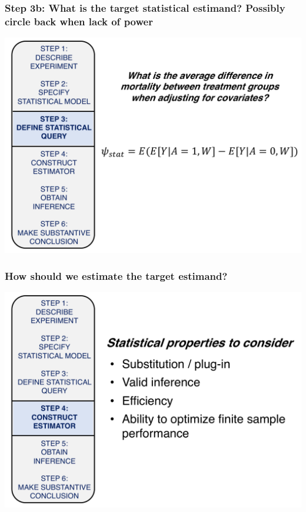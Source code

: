 \documentclass[t]{beamer}
\begin{document}
\begin{frame}
  \frametitle{Step 3b: What is the target statistical estimand? Possibly circle back when lack of power}
 \vspace{-20pt}
  \begin{center}
  \includegraphics[width = 1.05\textwidth]{figures/roadmap3_2.pdf}
  \end{center}
\end{frame}

\begin{frame}
  \frametitle{How should we estimate the target estimand?}
  \vspace{-20pt}
  \begin{center}
  \includegraphics[width = 1.05\textwidth]{figures/roadmap4.pdf}
  \end{center}
\end{frame}
\end{document}
